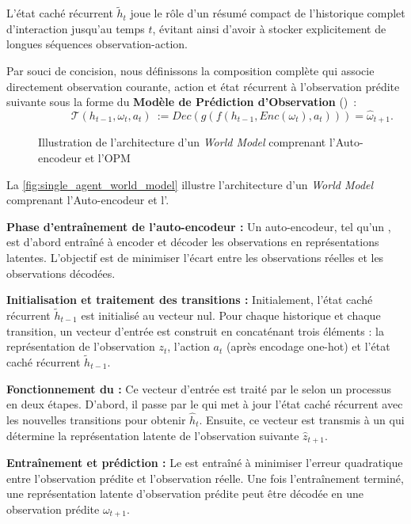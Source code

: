 L'état caché récurrent $\tilde{h}_t$ joue le rôle d'un résumé compact de l'historique complet d'interaction jusqu'au temps $t$, évitant ainsi d'avoir à stocker explicitement de longues séquences observation-action.

Par souci de concision, nous définissons la composition complète qui associe directement observation courante, action et état récurrent à l'observation prédite suivante sous la forme du \textbf{Modèle de Prédiction d'Observation} ()~:
\[
  \hspace{2cm}\mathcal{T}(h_{t-1}, \omega_t, a_t)~:= Dec(g(f(h_{t-1}, Enc(\omega_t), a_t))) = \hat{\omega}_{t+1}.
\]

\begin{figure}[h!]
  \centering
  \resizebox{\textwidth}{!}{%
    
  }
  \caption{Illustration de l'architecture d'un \textit{World Model} comprenant l'Auto-encodeur et l'OPM}
  \label{fig:single_agent_world_model}
\end{figure}

La \autoref{fig:single_agent_world_model} illustre l'architecture d'un \textit{World Model} comprenant l'Auto-encodeur et l'.

\textbf{Phase d'entraînement de l'auto-encodeur :} Un auto-encodeur, tel qu'un , est d'abord entraîné à encoder et décoder les observations en représentations latentes. L'objectif est de minimiser l'écart entre les observations réelles et les observations décodées.

\textbf{Initialisation et traitement des transitions :} Initialement, l'état caché récurrent $\tilde{h}_{t-1}$ est initialisé au vecteur nul. Pour chaque historique et chaque transition, un vecteur d'entrée est construit en concaténant trois éléments : la représentation de l'observation $z_t$, l'action $a_t$ (après encodage one-hot) et l'état caché récurrent $\tilde{h}_{t-1}$.

\textbf{Fonctionnement du  :} Ce vecteur d'entrée est traité par le  selon un processus en deux étapes. D'abord, il passe par le  qui met à jour l'état caché récurrent avec les nouvelles transitions pour obtenir $\hat{h}_t$. Ensuite, ce vecteur est transmis à un  qui détermine la représentation latente de l'observation suivante $\hat{z}_{t+1}$.

\textbf{Entraînement et prédiction :} Le  est entraîné à minimiser l'erreur quadratique entre l'observation prédite et l'observation réelle. Une fois l'entraînement terminé, une représentation latente d'observation prédite peut être décodée en une observation prédite $\omega_{t+1}$.


